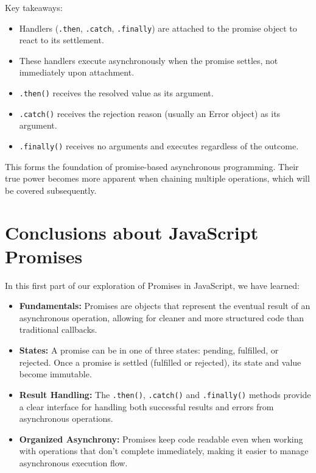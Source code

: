 \documentclass[12pt,letterpaper]{article}
\begin{document}
Key takeaways:
\begin{itemize}
    \item Handlers (\texttt{\textcolor{accentColor}{.then}}, \texttt{\textcolor{accentColor}{.catch}}, \texttt{\textcolor{accentColor}{.finally}}) are attached to the promise object to react to its settlement.
    \item These handlers execute asynchronously when the promise settles, not immediately upon attachment.
    \item \texttt{\textcolor{accentColor}{.then()}} receives the resolved value as its argument.
    \item \texttt{\textcolor{accentColor}{.catch()}} receives the rejection reason (usually an Error object) as its argument.
    \item \texttt{\textcolor{accentColor}{.finally()}} receives no arguments and executes regardless of the outcome.
\end{itemize}

This forms the foundation of promise-based asynchronous programming. Their true power becomes more apparent when chaining multiple operations, which will be covered subsequently.

\section{Conclusions about JavaScript Promises}

In this first part of our exploration of Promises in JavaScript, we have learned:

\begin{itemize}
    \item \textbf{\textcolor{accentColor}{Fundamentals:}} Promises are objects that represent the eventual result of an asynchronous operation, allowing for cleaner and more structured code than traditional callbacks.
    
    \item \textbf{\textcolor{accentColor}{States:}} A promise can be in one of three states: pending, fulfilled, or rejected. Once a promise is settled (fulfilled or rejected), its state and value become immutable.
    
    \item \textbf{\textcolor{accentColor}{Result Handling:}} The \texttt{\textcolor{accentColor}{.then()}}, \texttt{\textcolor{accentColor}{.catch()}} and \texttt{\textcolor{accentColor}{.finally()}} methods provide a clear interface for handling both successful results and errors from asynchronous operations.
    
    \item \textbf{\textcolor{accentColor}{Organized Asynchrony:}} Promises keep code readable even when working with operations that don't complete immediately, making it easier to manage asynchronous execution flow.
\end{itemize}
\end{document}
